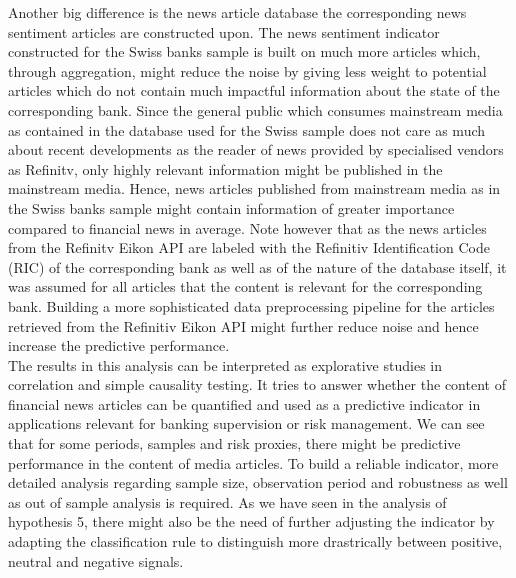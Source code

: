 Another big difference is the news article database the corresponding news sentiment articles are constructed upon. The news sentiment indicator constructed for the Swiss banks sample is built on much more articles which, through aggregation, might reduce the noise by giving less weight to potential articles which do not contain much impactful information about the state of the corresponding bank. Since the general public which consumes mainstream media as contained in the database used for the Swiss sample does not care as much about recent developments as the reader of news provided by specialised vendors as Refinitv, only highly relevant information might be published in the mainstream media. Hence, news articles published from mainstream media as in the Swiss banks sample might contain information of greater importance compared to financial news in average. Note however that as the news articles from the Refinitv Eikon API are labeled with the Refinitiv Identification Code (RIC) of the corresponding bank as well as of the nature of the database itself, it was assumed for all articles that the content is relevant for the corresponding bank. Building a more sophisticated data preprocessing pipeline for the articles retrieved from the Refinitiv Eikon API might further reduce noise and hence increase the predictive performance. \\

The results in this analysis can be interpreted as explorative studies in correlation and simple causality testing. It tries to answer whether the content of financial news articles can be quantified and used as a predictive indicator in applications relevant for banking supervision or risk management. We can see that for some periods, samples and risk proxies, there might be predictive performance in the content of media articles. To build a reliable indicator, more detailed analysis regarding sample size, observation period and robustness as well as out of sample analysis is required. As we have seen in the analysis of hypothesis 5, there might also be the need of further adjusting the indicator by adapting the classification rule to distinguish more drastrically between positive, neutral and negative signals. \\

